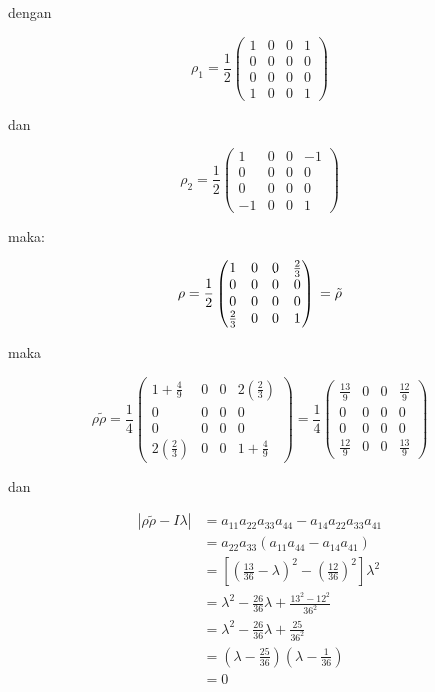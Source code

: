 dengan

\begin{equation}
	\rho_1 = \frac{1}{2}
	\begin{pmatrix}
		1&0&0&1\\
		0&0&0&0\\
		0&0&0&0\\
		1&0&0&1
	\end{pmatrix}
\end{equation}

dan

\begin{equation}
	\rho_2 = \frac{1}{2}
	\begin{pmatrix}
		1&0&0&-1\\
		0&0&0&0\\
		0&0&0&0\\
		-1&0&0&1
	\end{pmatrix}
\end{equation}

maka:  

\begin{equation}
	\rho =\frac{1}{2}
	\begin{pmatrix}
		1&0&0&\frac{2}{3}\\
		0&0&0&0\\
		0&0&0&0\\
		\frac{2}{3}&0&0&1
	\end{pmatrix}\\
	=\tilde{\rho}
\end{equation}

maka

\begin{equation}
	\rho \tilde{\rho}=\frac{1}{4}
	\begin{pmatrix}
		1+\frac{4}{9}&0&0&2(\frac{2}{3})\\
		0&0&0&0\\
		0&0&0&0\\
		2(\frac{2}{3})&0&0&1+\frac{4}{9}
	\end{pmatrix}
	=\frac{1}{4}
	\begin{pmatrix}
		\frac{13}{9}&0&0&\frac{12}{9}\\
		0&0&0&0\\
		0&0&0&0\\
		\frac{12}{9}&0&0&\frac{13}{9}
	\end{pmatrix}
\end{equation}

dan

\begin{equation}
	\begin{aligned}
		|\rho \tilde{\rho}-I\lambda|
		&=a_{11}a_{22}a_{33}a_{44}-a_{14}a_{22}a_{33}a_{41}\\
		&=a_{22}a_{33}(a_{11}a_{44}-a_{14}a_{41})\\
		&=[(\frac{13}{36}-\lambda)^2-(\frac{12}{36})^2]\lambda^2\\
		&=\lambda^2-\frac{26}{36}\lambda+\frac{13^2-12^2}{36^2}\\
		&=\lambda^2-\frac{26}{36}\lambda+\frac{25}{36^2}\\
		&=(\lambda-\frac{25}{36})(\lambda-\frac{1}{36})\\
		&=0
	\end{aligned}
\end{equation}

